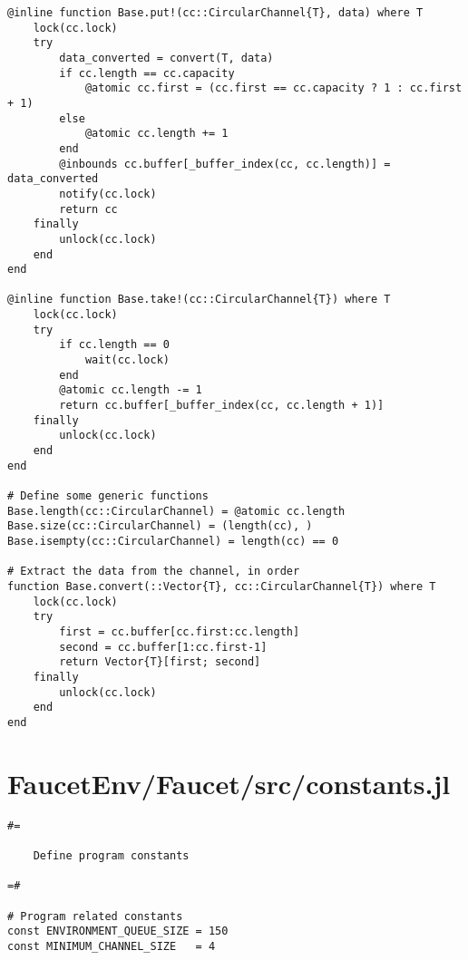 \begin{lstlisting}[language=JuliaLocal, style=julia]
@inline function Base.put!(cc::CircularChannel{T}, data) where T
    lock(cc.lock)
    try
        data_converted = convert(T, data)
        if cc.length == cc.capacity
            @atomic cc.first = (cc.first == cc.capacity ? 1 : cc.first + 1)
        else
            @atomic cc.length += 1
        end
        @inbounds cc.buffer[_buffer_index(cc, cc.length)] = data_converted
        notify(cc.lock)
        return cc
    finally
        unlock(cc.lock)
    end
end

@inline function Base.take!(cc::CircularChannel{T}) where T
    lock(cc.lock)
    try
        if cc.length == 0
            wait(cc.lock)
        end
        @atomic cc.length -= 1
        return cc.buffer[_buffer_index(cc, cc.length + 1)]
    finally
        unlock(cc.lock)
    end
end

# Define some generic functions
Base.length(cc::CircularChannel) = @atomic cc.length
Base.size(cc::CircularChannel) = (length(cc), )
Base.isempty(cc::CircularChannel) = length(cc) == 0

# Extract the data from the channel, in order
function Base.convert(::Vector{T}, cc::CircularChannel{T}) where T
    lock(cc.lock)
    try
        first = cc.buffer[cc.first:cc.length]
        second = cc.buffer[1:cc.first-1]
        return Vector{T}[first; second]
    finally
        unlock(cc.lock)
    end
end

\end{lstlisting}
\section{FaucetEnv/Faucet/src/constants.jl}
\begin{lstlisting}[language=JuliaLocal, style=julia]
#=

    Define program constants

=#

# Program related constants
const ENVIRONMENT_QUEUE_SIZE = 150
const MINIMUM_CHANNEL_SIZE   = 4
\end{lstlisting}
